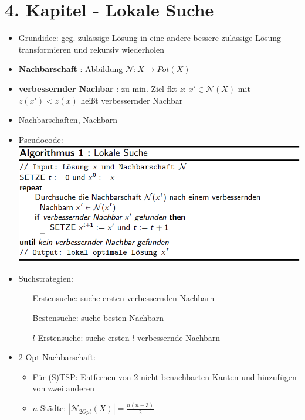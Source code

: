 \documentclass[12pt]{article}
\begin{document}
	\section{4. Kapitel - Lokale Suche}
		\begin{itemize}
			\item Grundidee: geg. zulässige Lösung in eine andere bessere zulässige Lösung transformieren und rekursiv wiederholen
			\item \textbf{Nachbarschaft} \label{Nachbarschaft}: Abbildung $ \mathcal{N}:X\rightarrow Pot(X)$
			\item \textbf{verbessernder Nachbar} \label{verbessernder Nachbar}: zu min. Ziel-fkt $z$: $x'\in\mathcal{N}(X)$ mit $z(x')<z(x)$ heißt verbessernder Nachbar
			\item \hyperref[Nachbarschaft]{Nachbarschaften}, \hyperref[verbessernder Nachbar]{Nachbarn}
			\item Pseudocode:\\
				\includegraphics[scale=0.6]{LokaleSuche}
			\item Suchstrategien:
				\begin{itemize}
					\item[Erstensuche:] suche ersten \hyperref[verbessernder Nachbar]{verbessernden Nachbarn}
					\item[Bestensuche:] suche besten \hyperref[verbessernder Nachbar]{Nachbarn}
					\item[$l$-Erstensuche:] suche ersten $l$ \hyperref[verbessernder Nachbar]{verbessernde Nachbarn}
				\end{itemize}
			\item 2-Opt Nachbarschaft:
				\begin{itemize}
					\item Für (S)\hyperref[TSP]{TSP}: Entfernen von 2 nicht benachbarten Kanten und hinzufügen von zwei anderen
					\item $n$-Städte: $|\mathcal{N}_{2Opt}(X)|= \frac{n(n-3)}{2}$
				\end{itemize}

\end{itemize}
\end{document}
